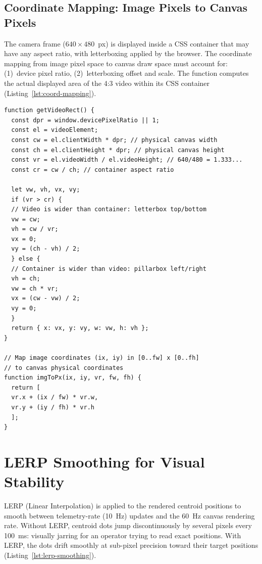 \subsection{Coordinate Mapping: Image Pixels to Canvas Pixels}

The camera frame ($640\times480$~px) is displayed inside a CSS container that may have any aspect ratio, with letterboxing applied by the browser. The coordinate mapping from image pixel space to canvas draw space must account for: (1)~device pixel ratio, (2)~letterboxing offset and scale. The  function computes the actual displayed area of the 4:3 video within its CSS container (Listing~\ref{lst:coord-mapping}).

\begin{lstlisting}[caption={Letterbox-aware coordinate mapping}, label={lst:coord-mapping}]
function getVideoRect() {
  const dpr = window.devicePixelRatio || 1;
  const el = videoElement;
  const cw = el.clientWidth * dpr; // physical canvas width
  const ch = el.clientHeight * dpr; // physical canvas height
  const vr = el.videoWidth / el.videoHeight; // 640/480 = 1.333...
  const cr = cw / ch; // container aspect ratio

  let vw, vh, vx, vy;
  if (vr > cr) {
  // Video is wider than container: letterbox top/bottom
  vw = cw;
  vh = cw / vr;
  vx = 0;
  vy = (ch - vh) / 2;
  } else {
  // Container is wider than video: pillarbox left/right
  vh = ch;
  vw = ch * vr;
  vx = (cw - vw) / 2;
  vy = 0;
  }
  return { x: vx, y: vy, w: vw, h: vh };
}

// Map image coordinates (ix, iy) in [0..fw] x [0..fh]
// to canvas physical coordinates
function imgToPx(ix, iy, vr, fw, fh) {
  return [
  vr.x + (ix / fw) * vr.w,
  vr.y + (iy / fh) * vr.h
  ];
}
\end{lstlisting}

\section{LERP Smoothing for Visual Stability}

LERP (Linear Interpolation) is applied to the rendered centroid positions to smooth between telemetry-rate (10~Hz) updates and the 60~Hz canvas rendering rate. Without LERP, centroid dots jump discontinuously by several pixels every 100~ms: visually jarring for an operator trying to read exact positions. With LERP, the dots drift smoothly at sub-pixel precision toward their target positions (Listing~\ref{lst:lerp-smoothing}).

